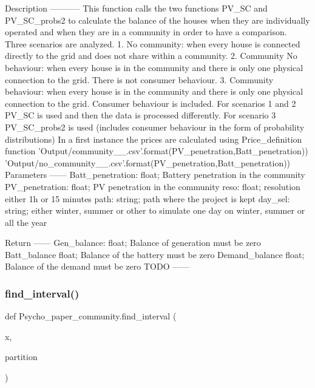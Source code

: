 \begin{DoxyVerb}Description
-----------
This function calls the two functions PV_SC and PV_SC_probs2 to calculate the balance of the houses when they are individually operated and when they are in a community in order to have a comparison.
Three scenarios are analyzed.
    1. No community: when every house is connected directly to the grid and does not share within a community.
    2. Community No behaviour: when every house is in the community and there is only one physical connection to the grid. There is not consumer behaviour.
    3. Community behaviour: when every house is in the community and there is only one physical connection to the grid. Consumer behaviour is included.
For scenarios 1 and 2 PV_SC is used and then the data is processed differently.
For scenario 3 PV_SC_probs2 is used (includes consumer behaviour in the form of probability distributions)
In a first instance the prices are calculated using Price_definition function
'Output/community_{}_{}.csv'.format(PV_penetration,Batt_penetration))
'Output/no_community_{}_{}.csv'.format(PV_penetration,Batt_penetration))
Parameters
------
Batt_penetration: float; Battery penetration in the community
PV_penetration: float; PV penetration in the community
reso: float; resolution either 1h or 15 minutes
path:  string; path where the project is kept
day_sel: string; either winter, summer or other to simulate one day on winter, summer or all the year

Return
------
Gen_balance: float; Balance of generation must be zero
Batt_balance float; Balance of the battery must be zero
Demand_balance float; Balance of the demand must be zero
TODO
------\end{DoxyVerb}
 \mbox{\label{namespace_psycho__paper__community_a281baf6a407d30a22e485f5f76a62c3c}} 
\subsubsection{\texorpdfstring{find\+\_\+interval()}{find\_interval()}}
{\footnotesize\ttfamily def Psycho\+\_\+paper\+\_\+community.\+find\+\_\+interval (\begin{DoxyParamCaption}\item[{}]{x,  }\item[{}]{partition }\end{DoxyParamCaption})}

